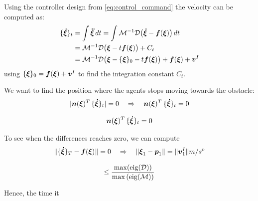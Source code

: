 Using the controller design from \eqref{eq:control_command} the velocity can be computed as:
\begin{equation}
\begin{split}
	\{ \vecs{\dot \xi} \}_{t} 
	& = \int \vecs{\ddot \xi} \, dt 
    = \int \matd{M}^{-1} \matd{D}  \bigl( \vecs{\dot \xi} - \vecs f(\vecs \xi) \bigr) \, dt \\
	&  = \matd{M}^{-1} \matd{D}  \bigl( \vecs \xi - t \vecs f(\vecs \xi) \bigr) + C_t \\
	  &  = \matd{M}^{-1} \matd{D}  \bigl( \vecs \xi - \{\vecs \xi\}_0  - t \vecs f(\vecs \xi) \bigr) + \vecs f(\vecs \xi) + \vecs v^I \\
\end{split}
\label{eq:velocity_evolution}
\end{equation}
using $\{ {\boldsymbol{\xi}} \}_0 = \boldsymbol{f}(\boldsymbol{\xi}) + \boldsymbol{v}^I$ to find the integration constant $C_t$.

We want to find the position where the agents stops moving towards the obstacle:
\begin{equation}
| \boldsymbol{n}(\boldsymbol{\xi})^T \, \{ \boldsymbol{\dot \xi} \}_{t} | = 0
\quad \Rightarrow \quad
\boldsymbol{n}(\boldsymbol{\xi})^T \, \{ \boldsymbol{\dot \xi} \}_{t} = 0
\end{equation}


\begin{equation}
\begin{split}
\boldsymbol{n}(\boldsymbol{\xi})^T \, \{ \boldsymbol{\dot \xi} \}_{t} = 0
\end{split}
\end{equation}

To see when the differences reaches zero, we can compute
\begin{equation}
 \|	\{ \boldsymbol{\dot \xi} \}_T - \boldsymbol{f}(\boldsymbol{\xi}) \| = 0
 \quad \Rightarrow \quad
    \| \boldsymbol{\xi}_1 -  \boldsymbol{p}_1 \| = \| \boldsymbol{v}^I_1 \| {m} / {s^{\mathrm{o}}} 
 \end{equation}

\begin{equation}
	\leq \frac{\max({\text{eig}(\mathcal{D})})}{\max{(\text{eig}(\mathcal{M})}) }
\end{equation}

Hence, the time it  



